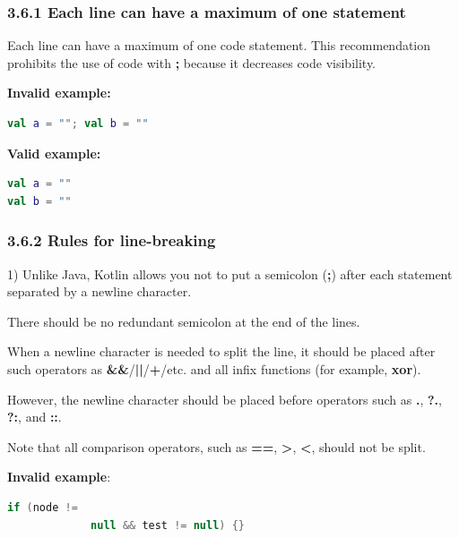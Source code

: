 {{{{{{{{{{{{{{{{{\subsubsection*{\textbf{3.6.1 Each line can have a maximum of one statement}}
\leavevmode\newline

\label{sec:3.6.1}

Each line can have a maximum of one code statement. This recommendation prohibits the use of code with \textbf{;} because it decreases code visibility.



\textbf{Invalid example:}

\begin{lstlisting}[language=Kotlin]
val a = ""; val b = ""
\end{lstlisting}


\textbf{Valid example:}

\begin{lstlisting}[language=Kotlin]
val a = ""
val b = ""
\end{lstlisting}


\subsubsection*{\textbf{3.6.2 Rules for line-breaking}}
\leavevmode\newline

\label{sec:3.6.2}



1) Unlike Java, Kotlin allows you not to put a semicolon (\textbf{;}) after each statement separated by a newline character.

    There should be no redundant semicolon at the end of the lines.

 

When a newline character is needed to split the line, it should be placed after such operators as \textbf{\&\&}/\textbf{||}/\textbf{+}/etc. and all infix functions (for example, \textbf{xor}).

However, the newline character should be placed before operators such as \textbf{.}, \textbf{?.}, \textbf{?:}, and \textbf{::}.



Note that all comparison operators, such as \textbf{==}, \textbf{>}, \textbf{<}, should not be split.



\textbf{Invalid example}: 

\begin{lstlisting}[language=Kotlin]
     if (node !=
             null && test != null) {}
\end{lstlisting}
 

}}}}}}}}}}}}}}}}}
